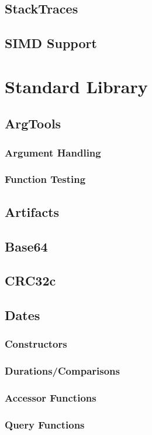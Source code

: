 \chapter{StackTraces}
\chapter{SIMD Support}




\part{Standard Library}
\chapter{ArgTools}
    \section{Argument Handling}
    \section{Function Testing}
\chapter{Artifacts}
\chapter{Base64}
\chapter{CRC32c}
\chapter{Dates}
    \section{Constructors}
    \section{Durations/Comparisons}
    \section{Accessor Functions}
    \section{Query Functions}
